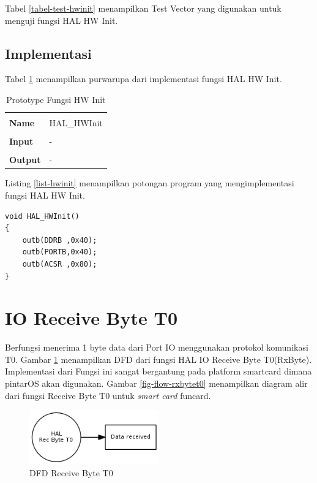 Tabel \ref{tabel-test-hwinit} menampilkan Test Vector yang digunakan untuk menguji fungsi HAL HW Init.

\subsection {Implementasi}

Tabel \ref{tabel-hwinit} menampilkan purwarupa dari implementasi fungsi HAL HW Init. 

\begin{table}[!h]
  \centering
  \begin{tabular}{p{2cm} p{8cm}}
    \hline\\
    {\bf Name} & HAL\_HWInit\\
    \hline\\
    {\bf Input} & -
    \\
    \hline\\
    {\bf Output} & -
    \\
    \hline
  \end{tabular}
  \caption{Prototype Fungsi HW Init}
  \label{tabel-hwinit}
\end{table}

Listing \ref{list-hwinit} menampilkan potongan program yang mengimplementasi fungsi HAL HW Init.

\begin{lstlisting}[caption={Listing Program Fungsi HAL HW Init}, label={list-hwinit}]
void HAL_HWInit()
{
	outb(DDRB ,0x40);
	outb(PORTB,0x40);
	outb(ACSR ,0x80);
}
\end{lstlisting}

\section{IO Receive Byte T0}
\label{sec_rxbytet0}

Berfungsi menerima 1 byte data dari Port IO menggunakan protokol komunikasi T0. Gambar \ref{fig-dfd-rxbytet0} menampilkan DFD dari fungsi HAL IO Receive Byte T0(RxByte). Implementasi dari Fungsi ini sangat bergantung pada platform smartcard dimana pintarOS akan digunakan. Gambar \ref{fig-flow-rxbytet0} menampilkan diagram alir dari fungsi Receive Byte T0 untuk \emph{smart card} funcard.

\begin{figure}[!h]
\centering
\includegraphics[width=0.5\textwidth]{image/hal/dfd_rxbytet0.png}
\caption{DFD Receive Byte T0}
\label{fig-dfd-rxbytet0}
\end{figure}

